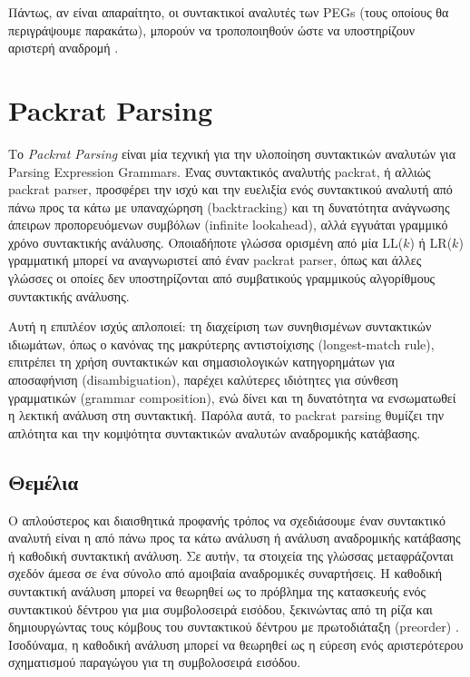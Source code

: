 \documentclass[diploma]{softlab-thesis}
\begin{document}
Πάντως, αν είναι απαραίτητο, οι συντακτικοί αναλυτές των PEGs (τους οποίους θα περιγράψουμε παρακάτω), μπορούν να τροποποιηθούν ώστε να υποστηρίζουν αριστερή αναδρομή \cite{Warth2008}.

\chapter{ Packrat Parsing }

Το \textit{Packrat Parsing} \cite{Ford2002a} είναι μία τεχνική για την υλοποίηση συντακτικών αναλυτών για Parsing Expression Grammars.
Ένας συντακτικός αναλυτής packrat, ή αλλιώς packrat parser, προσφέρει την ισχύ και την ευελιξία ενός συντακτικού αναλυτή από πάνω προς τα κάτω με υπαναχώρηση (backtracking) και τη δυνατότητα ανάγνωσης άπειρων προπορευόμενων συμβόλων (infinite lookahead), αλλά εγγυάται γραμμικό χρόνο συντακτικής ανάλυσης.
Οποιαδήποτε γλώσσα ορισμένη από μία LL($k$) ή LR($k$) γραμματική μπορεί να αναγνωριστεί από έναν packrat parser, όπως και άλλες γλώσσες οι οποίες δεν υποστηρίζονται από συμβατικούς γραμμικούς αλγορίθμους συντακτικής ανάλυσης.

Αυτή η επιπλέον ισχύς απλοποιεί: τη διαχείριση των συνηθισμένων συντακτικών ιδιωμάτων, όπως ο κανόνας της μακρύτερης αντιστοίχισης (longest-match rule), επιτρέπει τη χρήση συντακτικών και σημασιολογικών κατηγορημάτων για αποσαφήνιση (disambiguation), παρέχει καλύτερες ιδιότητες για σύνθεση γραμματικών (grammar composition), ενώ δίνει και τη δυνατότητα να ενσωματωθεί η λεκτική ανάλυση στη συντακτική.
Παρόλα αυτά, το packrat parsing θυμίζει την απλότητα και την κομψότητα συντακτικών αναλυτών αναδρομικής κατάβασης.

\section{Θεμέλια}

Ο απλούστερος και διαισθητικά προφανής τρόπος να σχεδιάσουμε έναν συντακτικό αναλυτή είναι η από πάνω προς τα κάτω ανάλυση ή ανάλυση αναδρομικής κατάβασης ή καθοδική συντακτική ανάλυση.
Σε αυτήν, τα στοιχεία της γλώσσας μεταφράζονται σχεδόν άμεσα σε ένα σύνολο από αμοιβαία αναδρομικές συναρτήσεις.
Η καθοδική συντακτική ανάλυση μπορεί να θεωρηθεί ως το πρόβλημα της κατασκευής ενός συντακτικού δέντρου για μια συμβολοσειρά εισόδου, ξεκινώντας από τη ρίζα και δημιουργώντας τους κόμβους του συντακτικού δέντρου με πρωτοδιάταξη (preorder) \cite{Aho2006}. Ισοδύναμα, η καθοδική ανάλυση μπορεί να θεωρηθεί ως η εύρεση ενός αριστερότερου σχηματισμού παραγώγου για τη συμβολοσειρά εισόδου.
\end{document}
